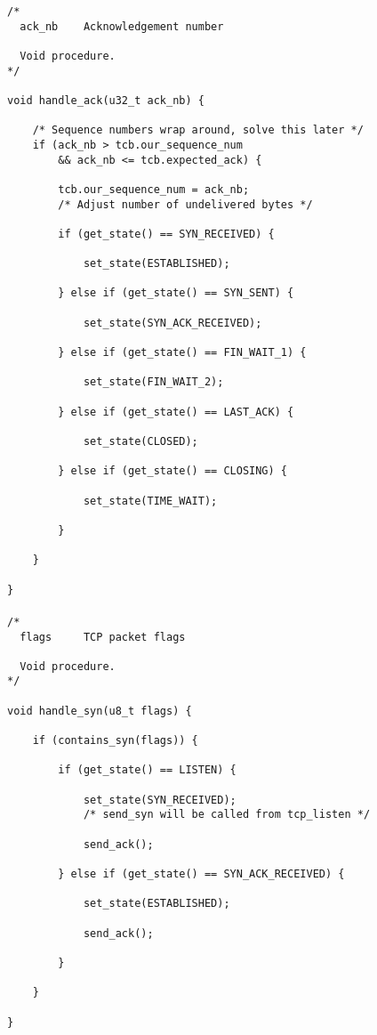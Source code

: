 \documentclass[11pt]{article}
\begin{document}
\begin{lstlisting}[title=Procedure handle\_ack]
/*
  ack_nb    Acknowledgement number

  Void procedure.
*/

void handle_ack(u32_t ack_nb) {

    /* Sequence numbers wrap around, solve this later */
    if (ack_nb > tcb.our_sequence_num
        && ack_nb <= tcb.expected_ack) {

        tcb.our_sequence_num = ack_nb;
        /* Adjust number of undelivered bytes */

        if (get_state() == SYN_RECEIVED) {

            set_state(ESTABLISHED);

        } else if (get_state() == SYN_SENT) {

            set_state(SYN_ACK_RECEIVED);

        } else if (get_state() == FIN_WAIT_1) {

            set_state(FIN_WAIT_2);

        } else if (get_state() == LAST_ACK) {

            set_state(CLOSED);

        } else if (get_state() == CLOSING) {

            set_state(TIME_WAIT);

        }

    }

}
\end{lstlisting}


\paragraph{}


\begin{lstlisting}[title=Procedure handle\_syn]
/*
  flags     TCP packet flags

  Void procedure.
*/

void handle_syn(u8_t flags) {

    if (contains_syn(flags)) {

        if (get_state() == LISTEN) {

            set_state(SYN_RECEIVED);
            /* send_syn will be called from tcp_listen */

            send_ack();

        } else if (get_state() == SYN_ACK_RECEIVED) {

            set_state(ESTABLISHED);

            send_ack();

        }

    }

}
\end{lstlisting}
\end{document}
